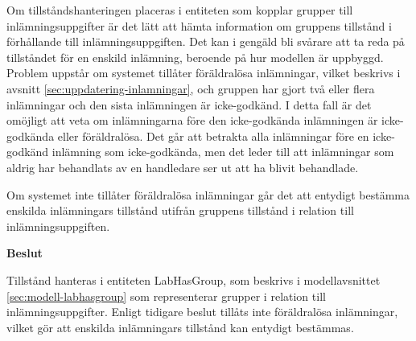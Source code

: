 Om tillståndshanteringen placeras i entiteten som kopplar grupper till inlämningsuppgifter är det lätt att hämta information om gruppens tillstånd i förhållande till inlämningsuppgiften. Det kan i gengäld bli svårare att ta reda på tillståndet för en enskild inlämning, beroende på hur modellen är uppbyggd. Problem uppstår om systemet tillåter föräldralösa inlämningar, vilket beskrivs i avsnitt \ref{sec:uppdatering-inlamningar}, och gruppen har gjort två eller flera inlämningar och den sista inlämningen är icke-godkänd. I detta fall är det omöjligt att veta om inlämningarna före den icke-godkända inlämningen är icke-godkända eller föräldralösa. Det går att betrakta alla inlämningar före en icke-godkänd inlämning som icke-godkända, men det leder till att inlämningar som aldrig har behandlats av en handledare ser ut att ha blivit behandlade.

Om systemet inte tillåter föräldralösa inlämningar går det att entydigt bestämma enskilda inlämningars tillstånd utifrån gruppens tillstånd i relation till inlämningsuppgiften.

\begin{flushright}

  \textbf{Beslut}

  Tillstånd hanteras i entiteten LabHasGroup, som beskrivs i modellavsnittet \ref{sec:modell-labhasgroup} som representerar grupper i relation till inlämningsuppgifter. Enligt tidigare beslut tillåts inte föräldralösa inlämningar, vilket gör att enskilda inlämningars tillstånd kan entydigt bestämmas.
\end{flushright}
